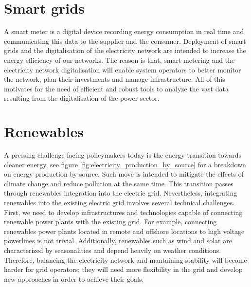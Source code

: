 \section{Smart grids}
A smart meter is a digital device recording energy consumption in real time and communicating this data to the supplier and the consumer.
Deployment of smart grids and the digitalisation of the electricity network are intended to increase the energy efficiency of our networks.
The reason is that, smart metering and the electricity network digitalisation  will enable system operators to better monitor the network, plan their investments and manage infrastructure. 
All of this motivates for the need of efficient and robust tools to analyze the vast data resulting from the digitalisation of the power sector.

\section{Renewables}
A pressing challenge facing policymakers today is the energy transition towards cleaner energy, see figure \ref{fig:electricity_production_by_source} for a breakdown on energy production by source. Such move is intended to mitigate the effects of climate change and reduce pollution at the same time.
This transition passes through renewables integration into the electric grid. 
Nevertheless, integrating renewables into the existing electric grid involves several technical challenges. First, we need to develop infrastructures and technologies capable of connecting renewable power plants with the existing grid. For example, connecting renewables power plants located in remote and offshore locations to high voltage powerlines is not trivial.
Additionally, renewables such as wind and solar are characterized by seasonalities and depend heavily on weather conditions. Therefore, balancing the electricity network and mantaining stability will become harder for grid operators; they will need more flexibility in the grid and develop new approaches in order to achieve their goals.

